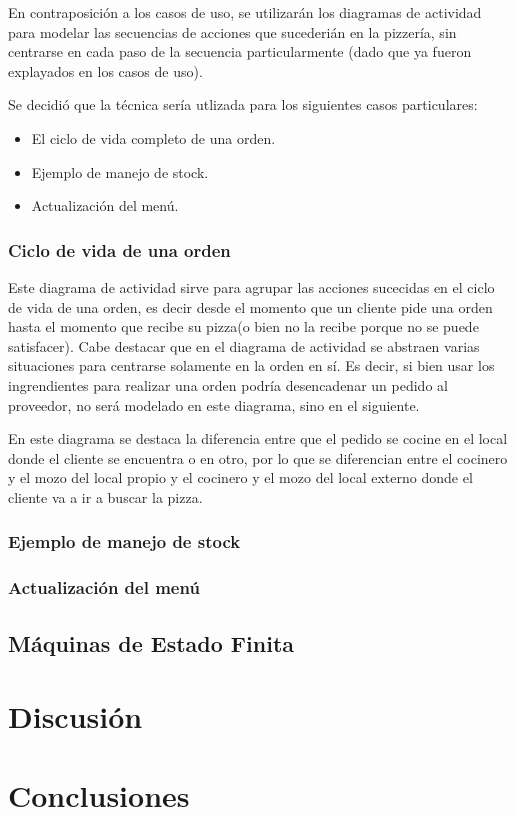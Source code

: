 \documentclass[a4paper,10pt]{article}
\begin{document}
En contraposici\'on a los casos de uso, se utilizar\'an los diagramas de actividad para modelar las secuencias de acciones que sucederi\'an en la 
pizzer\'ia, sin centrarse en cada paso de la secuencia particularmente (dado que ya fueron explayados en los casos de uso).

Se decidi\'o que la t\'ecnica ser\'ia utlizada para los siguientes casos particulares:

\begin{itemize}
\item El ciclo de vida completo de una orden.
\item Ejemplo de manejo de stock.
\item Actualizaci\'on del men\'u.
\end{itemize}


\subsubsection*{Ciclo de vida de una orden}

Este diagrama de actividad sirve para agrupar las acciones sucecidas en el ciclo de vida de una orden, es decir desde el momento que un cliente
pide una orden hasta el momento que recibe su pizza(o bien no la recibe porque no se puede satisfacer). Cabe destacar que en el diagrama de actividad
se abstraen varias situaciones para centrarse solamente en la orden en s\'i. Es decir, si bien usar los ingrendientes para realizar una orden podr\'ia
desencadenar un pedido al proveedor, no ser\'a modelado en este diagrama, sino en el siguiente.

En este diagrama se destaca la diferencia entre que el pedido se cocine en el local donde el cliente se encuentra o en otro, por lo que se 
diferencian entre el cocinero y el mozo del local propio y el cocinero y el mozo del local externo donde el cliente va a ir a buscar la pizza.



\subsubsection*{Ejemplo de manejo de stock}


\subsubsection*{Actualizaci\'on del men\'u}


\bigskip

\subsection*{M\'aquinas de Estado Finita}


\newpage


\section*{Discusi\'on}




\newpage
\section*{Conclusiones}
\end{document}
